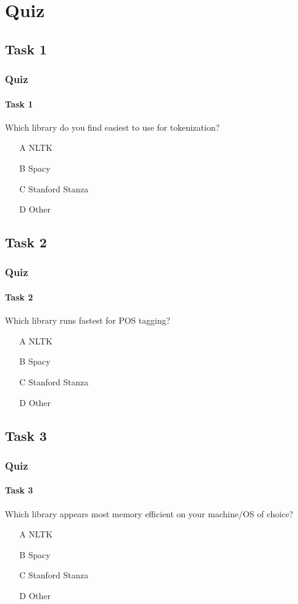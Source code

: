 \documentclass{beamer}
\begin{document}
\section{Quiz}
\subsection{Task 1}
\begin{frame}
    \frametitle{Quiz}
    \framesubtitle{Task 1}
    Which library do you find easiest to use for tokenization?
    \begin{enumerate}
        \item[A] NLTK
        \item[B] Spacy
        \item[C] Stanford Stanza
        \item[D] Other
    \end{enumerate}
\end{frame}

\subsection{Task 2}
\begin{frame}
    \frametitle{Quiz}
    \framesubtitle{Task 2}
    Which library runs fastest for POS tagging?
    \begin{enumerate}
        \item[A] NLTK
        \item[B] Spacy
        \item[C] Stanford Stanza
        \item[D] Other
    \end{enumerate}
\end{frame}

\subsection{Task 3}
\begin{frame}
    \frametitle{Quiz}
    \framesubtitle{Task 3}
    Which library appears most memory efficient on your machine/OS of choice?
    \begin{enumerate}
        \item[A] NLTK
        \item[B] Spacy
        \item[C] Stanford Stanza
        \item[D] Other
    \end{enumerate}
\end{frame}
\end{document}
